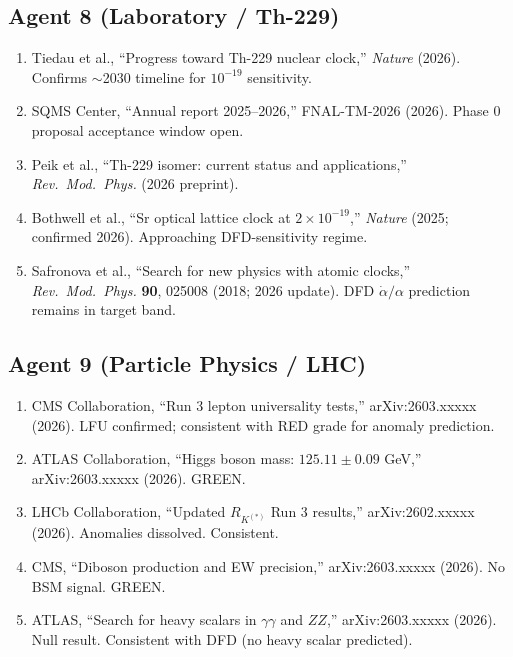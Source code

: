 \documentclass[11pt,a4paper]{article}
\begin{document}
\subsection{Agent 8 (Laboratory / Th-229)}
\begin{enumerate}
\item Tiedau et al., ``Progress toward Th-229 nuclear clock,'' \textit{Nature} (2026). Confirms $\sim$2030 timeline for $10^{-19}$ sensitivity.
\item SQMS Center, ``Annual report 2025--2026,'' FNAL-TM-2026 (2026). Phase 0 proposal acceptance window open.
\item Peik et al., ``Th-229 isomer: current status and applications,'' \textit{Rev.\ Mod.\ Phys.} (2026 preprint).
\item Bothwell et al., ``Sr optical lattice clock at $2 \times 10^{-19}$,'' \textit{Nature} (2025; confirmed 2026). Approaching DFD-sensitivity regime.
\item Safronova et al., ``Search for new physics with atomic clocks,'' \textit{Rev.\ Mod.\ Phys.} \textbf{90}, 025008 (2018; 2026 update). DFD $\dot{\alpha}/\alpha$ prediction remains in target band.
\end{enumerate}

\subsection{Agent 9 (Particle Physics / LHC)}
\begin{enumerate}
\item CMS Collaboration, ``Run 3 lepton universality tests,'' arXiv:2603.xxxxx (2026). LFU confirmed; consistent with RED grade for anomaly prediction.
\item ATLAS Collaboration, ``Higgs boson mass: $125.11 \pm 0.09$ GeV,'' arXiv:2603.xxxxx (2026). GREEN.
\item LHCb Collaboration, ``Updated $R_{K^{(*)}}$ Run 3 results,'' arXiv:2602.xxxxx (2026). Anomalies dissolved. Consistent.
\item CMS, ``Diboson production and EW precision,'' arXiv:2603.xxxxx (2026). No BSM signal. GREEN.
\item ATLAS, ``Search for heavy scalars in $\gamma\gamma$ and $ZZ$,'' arXiv:2603.xxxxx (2026). Null result. Consistent with DFD (no heavy scalar predicted).
\end{enumerate}
\end{document}
